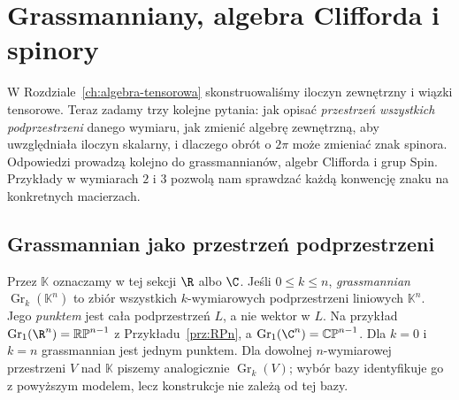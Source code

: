 \chapter{Grassmanniany, algebra Clifforda i spinory}
\label{ch:grass-spin}

W Rozdziale~\ref{ch:algebra-tensorowa} skonstruowaliśmy iloczyn
zewnętrzny i wiązki tensorowe. Teraz zadamy trzy kolejne pytania:
jak opisać \emph{przestrzeń wszystkich podprzestrzeni} danego wymiaru,
jak zmienić algebrę zewnętrzną, aby uwzględniała iloczyn skalarny,
i dlaczego obrót o $2\pi$ może zmieniać znak spinora.
Odpowiedzi prowadzą kolejno do grassmannianów, algebr Clifforda
i grup Spin. Przykłady w wymiarach $2$ i $3$ pozwolą nam
sprawdzać każdą konwencję znaku na konkretnych macierzach.

\section{Grassmannian jako przestrzeń podprzestrzeni}
\label{sec:grass-atlas}

Przez $\mathbb K$ oznaczamy w tej sekcji $\R$ albo $\C$.
Jeśli $0\leq k\leq n$, \emph{grassmannian}
$\operatorname{Gr}_k(\mathbb K^n)$ to zbiór wszystkich
$k$-wymiarowych podprzestrzeni liniowych $\mathbb K^n$.
Jego \emph{punktem} jest cała podprzestrzeń $L$,
a nie wektor w $L$. Na przykład
$\operatorname{Gr}_1(\R^n)=\mathbb{RP}^{n-1}$
z Przykładu~\ref{prz:RPn}, a
$\operatorname{Gr}_1(\C^n)=\mathbb{CP}^{n-1}$.
Dla $k=0$ i $k=n$ grassmannian jest jednym punktem.
Dla dowolnej $n$-wymiarowej przestrzeni $V$ nad $\mathbb K$
piszemy analogicznie $\operatorname{Gr}_k(V)$; wybór bazy
identyfikuje go z powyższym modelem, lecz konstrukcje nie zależą od tej bazy.

